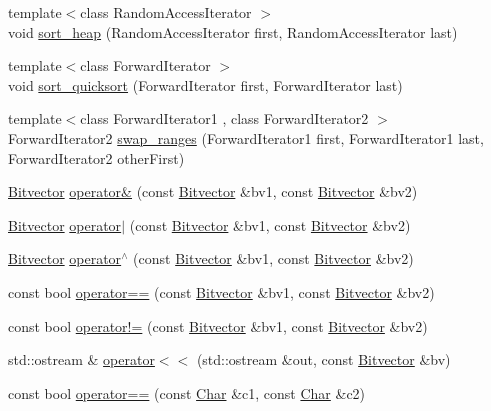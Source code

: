 \begin{DoxyCompactItemize}
\item 
{\footnotesize template$<$class Random\+Access\+Iterator $>$ }\\void \hyperlink{namespaceprism_a1e9fe74c5dcee70bf5dd5c89f1234a02}{sort\+\_\+heap} (Random\+Access\+Iterator first, Random\+Access\+Iterator last)
\item 
{\footnotesize template$<$class Forward\+Iterator $>$ }\\void \hyperlink{namespaceprism_a720fbbcb3f399b006969bb00a66686f9}{sort\+\_\+quicksort} (Forward\+Iterator first, Forward\+Iterator last)
\item 
{\footnotesize template$<$class Forward\+Iterator1 , class Forward\+Iterator2 $>$ }\\Forward\+Iterator2 \hyperlink{namespaceprism_a4661f2c0c4dca098c137179b4d93f3dc}{swap\+\_\+ranges} (Forward\+Iterator1 first, Forward\+Iterator1 last, Forward\+Iterator2 other\+First)
\item 
\hyperlink{classprism_1_1_bitvector}{Bitvector} \hyperlink{namespaceprism_a26b2b2b5b2c5f305badd964c24625b36}{operator\&} (const \hyperlink{classprism_1_1_bitvector}{Bitvector} \&bv1, const \hyperlink{classprism_1_1_bitvector}{Bitvector} \&bv2)
\item 
\hyperlink{classprism_1_1_bitvector}{Bitvector} \hyperlink{namespaceprism_a145d1e196c14cdbdc4eccb01c60c9275}{operator$\vert$} (const \hyperlink{classprism_1_1_bitvector}{Bitvector} \&bv1, const \hyperlink{classprism_1_1_bitvector}{Bitvector} \&bv2)
\item 
\hyperlink{classprism_1_1_bitvector}{Bitvector} \hyperlink{namespaceprism_a6a18ff84f30ae8056d6807056a24ef14}{operator$^\wedge$} (const \hyperlink{classprism_1_1_bitvector}{Bitvector} \&bv1, const \hyperlink{classprism_1_1_bitvector}{Bitvector} \&bv2)
\item 
const bool \hyperlink{namespaceprism_aca036c7f0f8a5aaf98b46b4879189bcc}{operator==} (const \hyperlink{classprism_1_1_bitvector}{Bitvector} \&bv1, const \hyperlink{classprism_1_1_bitvector}{Bitvector} \&bv2)
\item 
const bool \hyperlink{namespaceprism_aca663878d61686ef365f3e51efddc4b4}{operator!=} (const \hyperlink{classprism_1_1_bitvector}{Bitvector} \&bv1, const \hyperlink{classprism_1_1_bitvector}{Bitvector} \&bv2)
\item 
std\+::ostream \& \hyperlink{namespaceprism_a0b98ff0fee78022242292f24158ad1f0}{operator$<$$<$} (std\+::ostream \&out, const \hyperlink{classprism_1_1_bitvector}{Bitvector} \&bv)
\item 
const bool \hyperlink{namespaceprism_a1ba68b64a6cfdcff9e144b8c2476cddb}{operator==} (const \hyperlink{classprism_1_1_char}{Char} \&c1, const \hyperlink{classprism_1_1_char}{Char} \&c2)

\end{DoxyCompactItemize}
